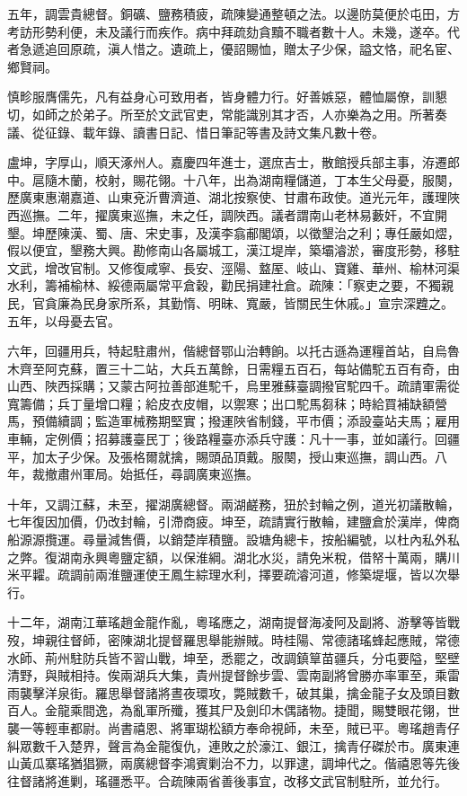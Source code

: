 \begin{pinyinscope}
五年，調雲貴總督。銅礦、鹽務積疲，疏陳變通整頓之法。以邊防莫便於屯田，方考訪形勢利便，未及議行而疾作。病中拜疏劾貪黷不職者數十人。未幾，遂卒。代者急遞追回原疏，滇人惜之。遺疏上，優詔賜恤，贈太子少保，謚文恪，祀名宦、鄉賢祠。

慎畛服膺儒先，凡有益身心可致用者，皆身體力行。好善嫉惡，體恤屬僚，訓懇切，如師之於弟子。所至於文武官吏，常能識別其才否，人亦樂為之用。所著奏議、從征錄、載年錄、讀書日記、惜日筆記等書及詩文集凡數十卷。

盧坤，字厚山，順天涿州人。嘉慶四年進士，選庶吉士，散館授兵部主事，洊遷郎中。扈隨木蘭，校射，賜花翎。十八年，出為湖南糧儲道，丁本生父母憂，服闋，歷廣東惠潮嘉道、山東兗沂曹濟道、湖北按察使、甘肅布政使。道光元年，護理陜西巡撫。二年，擢廣東巡撫，未之任，調陜西。議者謂南山老林易藪奸，不宜開墾。坤歷陳漢、蜀、唐、宋史事，及漢李翕郙閣頌，以徵墾治之利；專任嚴如熤，假以便宜，墾務大興。勘修南山各屬城工，漢江堤岸，築壩濬淤，審度形勢，移駐文武，增改官制。又修復咸寧、長安、涇陽、盩厔、岐山、寶雞、華州、榆林河渠水利，籌補榆林、綏德兩屬常平倉穀，勸民捐建社倉。疏陳：「察吏之要，不獨親民，官貪廉為民身家所系，其勤惰、明昧、寬嚴，皆關民生休戚。」宣宗深韙之。五年，以母憂去官。

六年，回疆用兵，特起駐肅州，偕總督鄂山治轉餉。以托古遜為運糧首站，自烏魯木齊至阿克蘇，置三十二站，大兵五萬餘，日需糧五百石，每站備駝五百有奇，由山西、陜西採購；又蒙古阿拉善部進駝千，烏里雅蘇臺調撥官駝四千。疏請軍需從寬籌備；兵丁量增口糧；給皮衣皮帽，以禦寒；出口駝馬芻秣；時給買補缺額營馬，預備續調；監造軍械務期堅實；撥運陜省制錢，平市價；添設臺站夫馬；雇用車輛，定例價；招募護臺民丁；後路糧臺亦添兵守護：凡十一事，並如議行。回疆平，加太子少保。及張格爾就擒，賜頭品頂戴。服闋，授山東巡撫，調山西。八年，裁撤肅州軍局。始抵任，尋調廣東巡撫。

十年，又調江蘇，未至，擢湖廣總督。兩湖鹺務，狃於封輪之例，道光初議散輪，七年復因加價，仍改封輪，引滯商疲。坤至，疏請實行散輪，建鹽倉於漢岸，俾商船源源攬運。尋量減售價，以銷楚岸積鹽。設塘角總卡，按船編號，以杜內私外私之弊。復湖南永興粵鹽定額，以保淮綱。湖北水災，請免米稅，借帑十萬兩，購川米平糶。疏調前兩淮鹽運使王鳳生綜理水利，擇要疏濬河道，修築堤堰，皆以次舉行。

十二年，湖南江華瑤趙金龍作亂，粵瑤應之，湖南提督海凌阿及副將、游擊等皆戰歿，坤親往督師，密陳湖北提督羅思舉能辦賊。時桂陽、常德諸瑤蜂起應賊，常德水師、荊州駐防兵皆不習山戰，坤至，悉罷之，改調鎮筸苗疆兵，分屯要隘，堅壁清野，與賊相持。俟兩湖兵大集，貴州提督餘步雲、雲南副將曾勝亦率軍至，乘雷雨襲擊洋泉街。羅思舉督諸將晝夜環攻，斃賊數千，破其巢，擒金龍子女及頭目數百人。金龍乘間逸，為亂軍所殲，獲其尸及劍印木偶諸物。捷聞，賜雙眼花翎，世襲一等輕車都尉。尚書禧恩、將軍瑚松額方奉命視師，未至，賊已平。粵瑤趙青仔糾眾數千入楚界，聲言為金龍復仇，連敗之於濠江、銀江，擒青仔磔於市。廣東連山黃瓜寨瑤猶猖獗，兩廣總督李鴻賓剿治不力，以罪逮，調坤代之。偕禧恩等先後往督諸將進剿，瑤疆悉平。合疏陳兩省善後事宜，改移文武官制駐所，並允行。


\end{pinyinscope}
